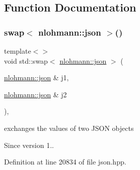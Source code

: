 \subsection{Function Documentation}
\mbox{\label{namespacestd_ace192546038d61d9c28ddfe0c3d732de}} 
\subsubsection{\texorpdfstring{swap$<$ nlohmann::json $>$()}{swap< nlohmann::json >()}}
{\footnotesize\ttfamily template$<$$>$ \\
void std\+::swap$<$ \mbox{\hyperlink{namespacenlohmann_a2bfd99e845a2e5cd90aeaf1b1431f474}{nlohmann\+::json}} $>$ (\begin{DoxyParamCaption}\item[{\mbox{\hyperlink{namespacenlohmann_a2bfd99e845a2e5cd90aeaf1b1431f474}{nlohmann\+::json}} \&}]{j1,  }\item[{\mbox{\hyperlink{namespacenlohmann_a2bfd99e845a2e5cd90aeaf1b1431f474}{nlohmann\+::json}} \&}]{j2 }\end{DoxyParamCaption})\hspace{0.3cm}{\ttfamily [inline]}, {\ttfamily [noexcept]}}



exchanges the values of two J\+S\+ON objects 

\begin{DoxySince}{Since}
version 1.. 
\end{DoxySince}


Definition at line 20834 of file json.\+hpp.

